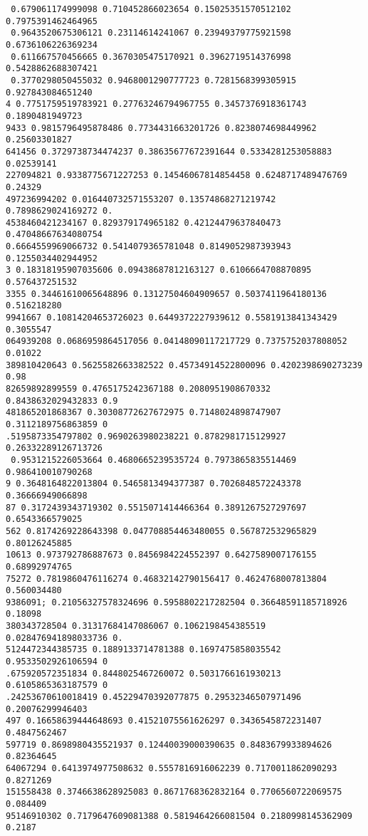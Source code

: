 \documentclass[12pt,a4paper]{article}
\begin{document}
\begin{lstlisting}
 0.679061174999098 0.710452866023654 0.15025351570512102 0.7975391462464965
 0.9643520675306121 0.23114614241067 0.23949379775921598 0.6736106226369234
 0.611667570456665 0.3670305475170921 0.3962719514376998 0.5428862688307421
 0.3770298050455032 0.9468001290777723 0.7281568399305915 0.927843084651240
4 0.7751759519783921 0.27763246794967755 0.3457376918361743 0.1890481949723
9433 0.9815796495878486 0.7734431663201726 0.8238074698449962 0.25603301827
641456 0.3729738734474237 0.38635677672391644 0.5334281253058883 0.02539141
227094821 0.9338775671227253 0.14546067814854458 0.6248717489476769 0.24329
497236994202 0.016440732571553207 0.13574868271219742 0.7898629024169272 0.
4538460421234167 0.829379174965182 0.42124479637840473 0.47048667634080754 
0.6664559969066732 0.5414079365781048 0.8149052987393943 0.1255034402944952
3 0.18318195907035606 0.09438687812163127 0.6106664708870895 0.576437251532
3355 0.34461610065648896 0.13127504604909657 0.5037411964180136 0.516218280
9941667 0.10814204653726023 0.6449372227939612 0.5581913841343429 0.3055547
064939208 0.0686959864517056 0.04148090117217729 0.7375752037808052 0.01022
389810420643 0.5625582663382522 0.45734914522800096 0.4202398690273239 0.98
82659892899559 0.4765175242367188 0.2080951908670332 0.8438632029432833 0.9
481865201868367 0.30308772627672975 0.7148024898747907 0.3112189756863859 0
.5195873354797802 0.9690263980238221 0.8782981715129927 0.26332289126713726
 0.9531215226053664 0.4680665239535724 0.7973865835514469 0.986410010790268
9 0.3648164822013804 0.5465813494377387 0.7026848572243378 0.36666949066898
87 0.3172439343719302 0.5515071414466364 0.3891267527297697 0.6543366579025
562 0.8174269228643398 0.047708854463480055 0.567872532965829 0.80126245885
10613 0.973792786887673 0.8456984224552397 0.6427589007176155 0.68992974765
75272 0.7819860476116274 0.46832142790156417 0.4624768007813804 0.560034480
9386091; 0.21056327578324696 0.5958802217282504 0.36648591185718926 0.18098
380343728504 0.31317684147086067 0.1062198454385519 0.028476941898033736 0.
5124472344385735 0.1889133714781388 0.1697475858035542 0.9533502926106594 0
.675920572351834 0.8448025467260072 0.5031766161930213 0.6105865363187579 0
.24253670610018419 0.45229470392077875 0.29532346507971496 0.20076299946403
497 0.16658639444648693 0.41521075561626297 0.3436545872231407 0.4847562467
597719 0.8698980435521937 0.12440039000390635 0.8483679933894626 0.82364645
64067294 0.6413974977508632 0.5557816916062239 0.7170011862090293 0.8271269
151558438 0.3746638628925083 0.8671768362832164 0.7706560722069575 0.084409
95146910302 0.7179647609081388 0.5819464266081504 0.2180998145362909 0.2187

\end{lstlisting}
\end{document}
